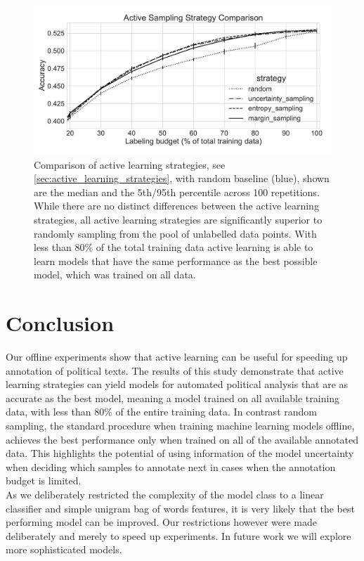 \documentclass[runningheads,a4paper]{article}
\begin{document}
\begin{figure}
\begin{center}
\includegraphics[width=\textwidth]{images/active_learning_manifesto.pdf} 
%
\end{center}
\caption{Comparison of active learning strategies, see \autoref{sec:active_learning_strategies}, with random baseline (blue), shown are the median and the 5th/95th percentile across 100 repetitions. While there are no distinct differences between the active learning strategies, all active learning strategies are significantly superior to randomly sampling from the pool of unlabelled data points. With less than 80\% of the total training data active learning is able to learn models that have the same performance as the best possible model, which was trained on all data. 
\label{fig:active_learning_curves}
}
\end{figure}

\section{Conclusion}
Our offline experiments show that active learning can be useful for speeding up annotation of political texts. The results of this study demonstrate that active learning strategies can yield models for automated political analysis that are as accurate as the best model, meaning a model trained on all available training data, with less than 80\% of the entire training data. In contrast random sampling, the standard procedure when training machine learning models offline, achieves the best performance only when trained on all of the available annotated data. 
This highlights the potential of using information of the model uncertainty when deciding which samples to annotate next in cases when the annotation budget is limited. \\


As we deliberately restricted the complexity of the model class to a linear classifier and simple unigram bag of words features, it is very likely that the best performing model can be improved. Our restrictions however were made deliberately and merely to speed up experiments. In future work we will explore more sophisticated models. \\
\end{document}
